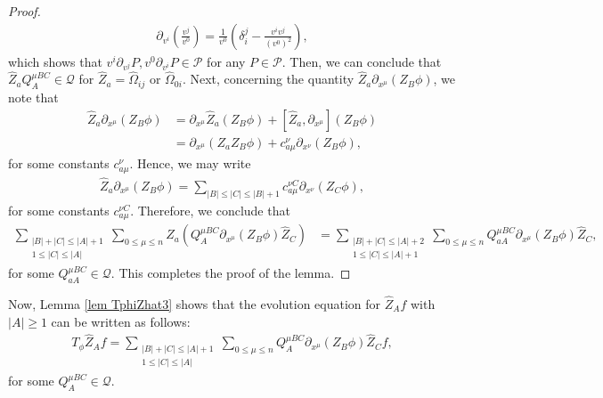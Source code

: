 \documentclass{article}
\newcommand{\cP}{{\mathcal P}}
\newcommand{\cQ}{{\mathcal Q}}
\begin{document}
\begin{proof}
\begin{align*}
\partial_{ v^i } \left( \frac{ v^j }{ v^0 } \right) = \frac{ 1 }{ v^0 } \left( \delta_i^j - \frac{ v^i v^j }{ ( v^0 )^2 } \right) ,
\end{align*}
which shows that $ v^i \partial_{ v^j } P , v^0 \partial_{ v^i } P \in \cP $ for any $ P \in \cP $. Then, we can conclude that $ \hat{ Z }_a Q^{ \mu B C }_{ A } \in \cQ $ for $ \hat{ Z }_a = \hat{ \Omega }_{ i j } $ or $ \hat{ \Omega }_{ 0 i } $. Next, concerning the quantity $ \hat{ Z }_a \partial_{ x^\mu } ( Z_B \phi ) $, we note that
\begin{align*}
\hat{ Z }_a \partial_{ x^\mu } ( Z_B \phi ) & = \partial_{ x^\mu } \hat{ Z }_a ( Z_B \phi ) + \left[ \hat{ Z }_a , \partial_{ x^\mu } \right] ( Z_B \phi ) \\
& = \partial_{ x^\mu } ( Z_a Z_B \phi ) + c^\nu_{ a \mu } \partial_{ x^\nu } ( Z_B \phi ) ,
\end{align*}
for some constants $ c^\nu_{ a \mu } $. Hence, we may write
\begin{align*}
\hat{ Z }_a \partial_{ x^\mu } ( Z_B \phi ) = \sum_{ | B | \leq | C | \leq | B | + 1 } c^{ \nu C }_{ a \mu } \partial_{ x^\nu } ( Z_C \phi ) ,
\end{align*}
for some constants $ c^{ \nu C }_{ a \mu } $. Therefore, we conclude that
\begin{align*}
\sum_{ \substack{ | B | + | C | \leq | A | + 1 \\ 1 \leq | C | \leq | A | } } \sum_{ 0 \leq \mu \leq n } \hat{ Z }_a \left( Q^{ \mu B C }_{ A } \partial_{ x^\mu } ( Z_B \phi ) \hat{ Z }_C \right) & = \sum_{ \substack{ | B | + | C | \leq | A | + 2 \\ 1 \leq | C | \leq | A | +1 } } \sum_{ 0 \leq \mu \leq n } Q^{ \mu B C }_{ a A } \partial_{ x^\mu } ( Z_B \phi ) \hat{ Z }_C ,
\end{align*}
for some $ Q^{ \mu B C }_{ a A } \in \cQ $. This completes the proof of the lemma.
\end{proof}



Now, Lemma \ref{lem TphiZhat3} shows that the evolution equation for $ \hat{ Z }_A f $ with $ | A | \geq 1 $ can be written as follows:
\begin{align}
T_\phi \hat{ Z }_A f = \sum_{ \substack{ | B | + | C | \leq | A | + 1 \\ 1 \leq | C | \leq | A | } } \sum_{ 0 \leq \mu \leq n } Q^{ \mu B C }_{ A } \partial_{ x^\mu } ( Z_B \phi ) \hat{ Z }_C f , \label{TphiZf}
\end{align}
for some $ Q^{ \mu B C }_{ A } \in \cQ $.
\end{document}
